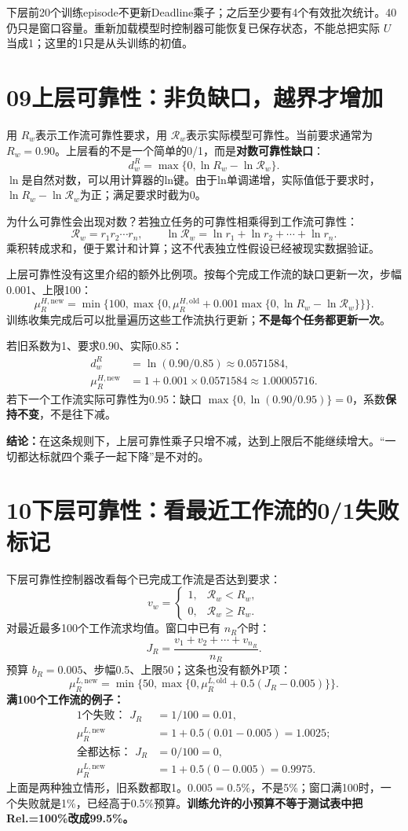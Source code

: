 \documentclass[UTF8,11pt,a4paper,fontset=fandol]{ctexart}
\newcommand{\lesson}[2]{\section*{#1\quad #2}}
\begin{document}
下层前20个训练episode不更新Deadline乘子；之后至少要有4个有效批次统计。40仍只是窗口容量。重新加载模型时控制器可能恢复已保存状态，不能总把实际 $U$当成1；这里的1只是从头训练的初值。

\newpage
\lesson{09}{上层可靠性：非负缺口，越界才增加}
用 $R_w$表示工作流可靠性要求，用 $\mathcal R_w$表示实际模型可靠性。当前要求通常为 $R_w=0.90$。上层看的不是一个简单的0/1，而是\textbf{对数可靠性缺口}：
\[
d_w^R=\max\{0,\ln R_w-\ln\mathcal R_w\}.
\]
$\ln$是自然对数，可以用计算器的ln键。由于ln单调递增，实际值低于要求时，$\ln R_w-\ln\mathcal R_w$为正；满足要求时截为0。

为什么可靠性会出现对数？若独立任务的可靠性相乘得到工作流可靠性：
\[
\mathcal R_w=r_1r_2\cdots r_n,
\qquad
\ln\mathcal R_w=\ln r_1+\ln r_2+\cdots+\ln r_n.
\]
乘积转成求和，便于累计和计算；这不代表独立性假设已经被现实数据验证。

上层可靠性没有这里介绍的额外比例项。按每个完成工作流的缺口更新一次，步幅0.001、上限100：
\[
\mu_R^{H,\mathrm{new}}=
\min\{100,\max\{0,\mu_R^{H,\mathrm{old}}
+0.001\max\{0,\ln R_w-\ln\mathcal R_w\}\}\}.
\]
训练收集完成后可以批量遍历这些工作流执行更新；\textbf{不是每个任务都更新一次}。

\begin{examplebox}
若旧系数为1、要求0.90、实际0.85：
\begin{align*}
d_w^R&=\ln(0.90/0.85)\approx0.0571584,\\
\mu_R^{H,\mathrm{new}}&=1+0.001\times0.0571584\approx1.00005716.
\end{align*}
若下一个工作流实际可靠性为0.95：缺口
$\max\{0,\ln(0.90/0.95)\}=0$，系数\textbf{保持不变}，不是往下减。
\end{examplebox}

\textbf{结论：}在这条规则下，上层可靠性乘子只增不减，达到上限后不能继续增大。“一切都达标就四个乘子一起下降”是不对的。

\newpage
\lesson{10}{下层可靠性：看最近工作流的0/1失败标记}
下层可靠性控制器改看每个已完成工作流是否达到要求：
\[
v_w=\begin{cases}
1,&\mathcal R_w<R_w,\\
0,&\mathcal R_w\ge R_w.
\end{cases}
\]
对最近最多100个工作流求均值。窗口中已有 $n_R$个时：
\[
J_R=\frac{v_1+v_2+\cdots+v_{n_R}}{n_R}.
\]
预算 $b_R=0.005$、步幅0.5、上限50；这条也没有额外P项：
\[
\mu_R^{L,\mathrm{new}}=
\min\{50,\max\{0,\mu_R^{L,\mathrm{old}}+0.5(J_R-0.005)\}\}.
\]
\textbf{满100个工作流的例子：}
\begin{align*}
\text{1个失败： }J_R&=1/100=0.01,\\
\mu_R^{L,\mathrm{new}}&=1+0.5(0.01-0.005)=1.0025;\\[2pt]
\text{全都达标： }J_R&=0/100=0,\\
\mu_R^{L,\mathrm{new}}&=1+0.5(0-0.005)=0.9975.
\end{align*}
上面是两种独立情形，旧系数都取1。$0.005=0.5\%$，不是5\%；窗口满100时，一个失败就是1\%，已经高于0.5\%预算。\textbf{训练允许的小预算不等于测试表中把Rel.=100\%改成99.5\%。}
\end{document}
